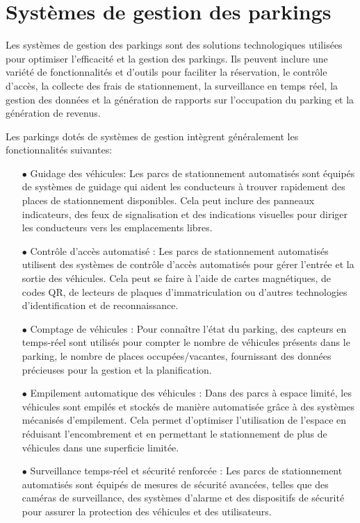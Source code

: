 \section{Systèmes de gestion des parkings}

Les systèmes de gestion des parkings sont des solutions technologiques utilisées pour optimiser l'efficacité et la gestion des parkings. Ils peuvent inclure une variété de fonctionnalités et d'outils pour faciliter la réservation, le contrôle d'accès, la collecte des frais de stationnement, la surveillance en temps réel, la gestion des données et la génération de rapports sur l’occupation du parking et la génération de revenus. 

Les parkings dotés de systèmes de gestion intègrent généralement les fonctionnalités suivantes:

\begin{enumerate}
   \item [$\bullet$]  Guidage des véhicules: Les parcs de stationnement automatisés sont équipés de systèmes de guidage qui aident les conducteurs à trouver rapidement des places de stationnement disponibles. Cela peut inclure des panneaux indicateurs, des feux de signalisation et des indications visuelles pour diriger les conducteurs vers les emplacements libres.
    \item [$\bullet$]  Contrôle d'accès automatisé : Les parcs de stationnement automatisés utilisent des systèmes de contrôle d'accès automatisés pour gérer l'entrée et la sortie des véhicules. Cela peut se faire à l'aide de cartes magnétiques, de codes QR, de lecteurs de plaques d'immatriculation ou d'autres technologies d'identification et de reconnaissance.
     \item [$\bullet$] Comptage de véhicules : Pour connaître l'état du parking, des capteurs en temps-réel sont utilisés pour compter le nombre de véhicules présents dans le parking, le nombre de places occupées/vacantes, fournissant des données précieuses pour la gestion et la planification.
   \item [$\bullet$] Empilement automatique des véhicules : Dans des parcs à espace limité, les véhicules sont empilés et stockés de manière automatisée grâce à des systèmes mécanisés d'empilement. Cela permet d'optimiser l'utilisation de l'espace en réduisant l'encombrement et en permettant le stationnement de plus de véhicules dans une superficie limitée.
    \item [$\bullet$] Surveillance temps-réel et sécurité renforcée : Les parcs de stationnement automatisés sont équipés de mesures de sécurité avancées, telles que des caméras de surveillance, des systèmes d'alarme et des dispositifs de sécurité pour assurer la protection des véhicules et des utilisateurs.

\end{enumerate}
